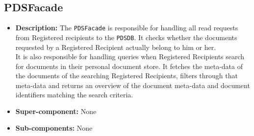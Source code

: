 \documentclass[a4paper,10pt]{article}
\begin{document}
\subsection{PDSFacade}
\begin{itemize}
    \item \textbf{Description:} The \texttt{PDSFacade} is responsible for handling all read requests from Registered recipients to the \texttt{PDSDB}. It checks whether the documents requested by a Registered Recipient actually belong to him or her.\\ It is also responsible for handling queries when Registered Recipients search for documents in their personal document store. It fetches the meta-data of the documents of the searching Registered Recipients, filters through that meta-data and returns an overview of the document meta-data and document identifiers matching the search criteria.
    \item \textbf{Super-component:} None
    \item \textbf{Sub-components:} None
\end{itemize}
\end{document}
